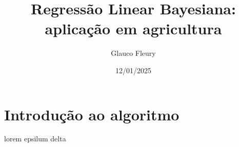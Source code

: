 \documentclass{article}
\title{Regressão Linear Bayesiana: aplicação em agricultura}
\author{
    Glauco Fleury
}
\date{12/01/2025}
\begin{document}
\maketitle

\section{Introdução ao algoritmo}

lorem epsilum delta
\end{document}
